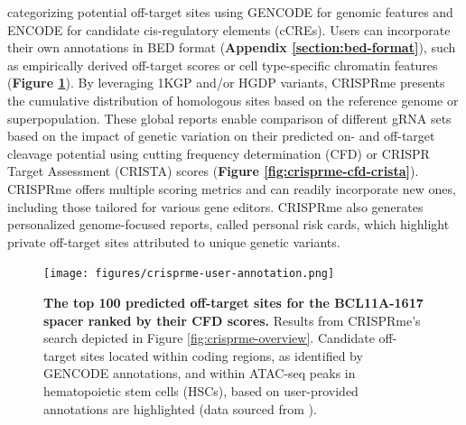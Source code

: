\documentclass[a4paper, titlepage, openright]{book}
\newcommand{\crisprme}{CRISPRme\xspace}
\begin{document}
categorizing potential off-target sites using GENCODE \citep{frankish2019gencode} for genomic features and ENCODE \citep{encode2012integrated} for candidate cis-regulatory elements (cCREs). Users can incorporate their own annotations in BED format (\textbf{Appendix \ref{section:bed-format}}), such as empirically derived off-target scores or cell type-specific chromatin features (\textbf{Figure \ref{fig:crisprme-user-annotation}}). By leveraging 1KGP \citep{10002015global} and/or HGDP \citep{bergstrom2020insights} variants, \crisprme presents the cumulative distribution of homologous sites based on the reference genome or superpopulation. These global reports enable comparison of different gRNA sets based on the impact of genetic variation on their predicted on- and off-target cleavage potential using cutting frequency determination (CFD) \citep{doench2016optimized} or CRISPR Target Assessment (CRISTA) \citep{abadi2017machine} scores (\textbf{Figure \ref{fig:crisprme-cfd-crista}}). \crisprme offers multiple scoring metrics and can readily incorporate new ones, including those tailored for various gene editors. \crisprme also generates personalized genome-focused reports, called personal risk cards, which highlight private off-target sites attributed to unique genetic variants.

\begin{figure}[!]
	\centering
	\texttt{[image: figures/crisprme-user-annotation.png]}
	\caption[The top 100 predicted off-target sites for the BCL11A-1617 spacer ranked by their CFD scores]{\textbf{The top 100 predicted off-target sites for the BCL11A-1617 spacer ranked by their CFD scores.} Results from \crisprme's search depicted in Figure \ref{fig:crisprme-overview}. Candidate off-target sites located within coding regions, as identified by GENCODE annotations, and within ATAC-seq peaks in hematopoietic stem cells (HSCs), based on user-provided annotations  are highlighted (data sourced from \cite{corces2016lineage}).}
	\label{fig:crisprme-user-annotation}
\end{figure}
\end{document}
